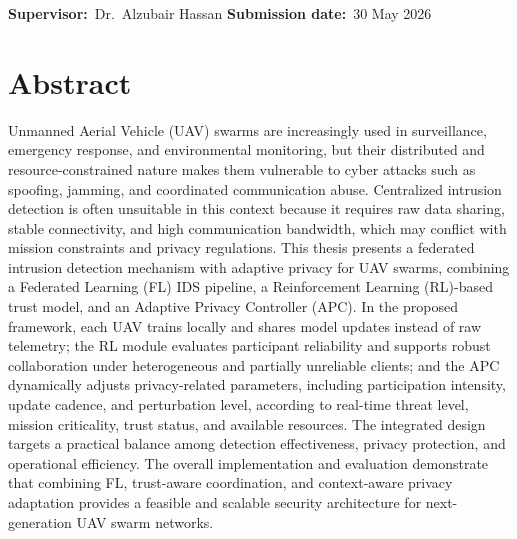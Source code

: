 \documentclass[11pt,a4paper,oneside]{report}
\begin{document}
\begin{titlepage}
\begin{center}
    \vspace{2em}
    \titlepagerule
    \vspace{1.35em}

    {\normalsize
      \textbf{Supervisor:}\ Dr.\ Alzubair Hassan
      \quad\textbar\quad
      \textbf{Submission date:}\ 30 May 2026}
  \end{center}

  \vspace*{\fill}
\end{titlepage}


\cleardoublepage
\chapter*{Abstract}

\noindent Unmanned Aerial Vehicle (UAV) swarms are increasingly used in surveillance, emergency response, and environmental monitoring, but their distributed and resource-constrained nature makes them vulnerable to cyber attacks such as spoofing, jamming, and coordinated communication abuse. Centralized intrusion detection is often unsuitable in this context because it requires raw data sharing, stable connectivity, and high communication bandwidth, which may conflict with mission constraints and privacy regulations. This thesis presents a federated intrusion detection mechanism with adaptive privacy for UAV swarms, combining a Federated Learning (FL) IDS pipeline, a Reinforcement Learning (RL)-based trust model, and an Adaptive Privacy Controller (APC). In the proposed framework, each UAV trains locally and shares model updates instead of raw telemetry; the RL module evaluates participant reliability and supports robust collaboration under heterogeneous and partially unreliable clients; and the APC dynamically adjusts privacy-related parameters, including participation intensity, update cadence, and perturbation level, according to real-time threat level, mission criticality, trust status, and available resources. The integrated design targets a practical balance among detection effectiveness, privacy protection, and operational efficiency. The overall implementation and evaluation demonstrate that combining FL, trust-aware coordination, and context-aware privacy adaptation provides a feasible and scalable security architecture for next-generation UAV swarm networks.
\end{document}
